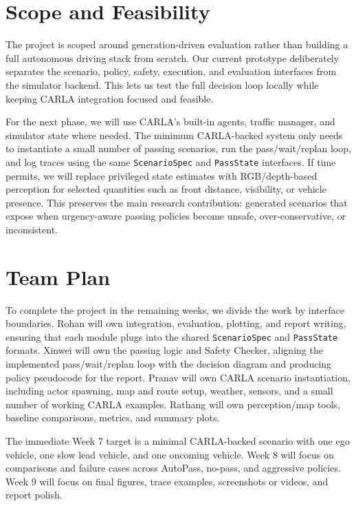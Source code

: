 \documentclass[10pt,twocolumn,letterpaper]{article}
\begin{document}

\section{Scope and Feasibility}
The project is scoped around generation-driven evaluation rather than building a full autonomous driving stack from scratch. Our current prototype deliberately separates the scenario, policy, safety, execution, and evaluation interfaces from the simulator backend. This lets us test the full decision loop locally while keeping CARLA integration focused and feasible. 

For the next phase, we will use CARLA's built-in agents, traffic manager, and simulator state where needed. The minimum CARLA-backed system only needs to instantiate a small number of passing scenarios, run the pass/wait/replan loop, and log traces using the same \texttt{ScenarioSpec} and \texttt{PassState} interfaces. If time permits, we will replace privileged state estimates with RGB/depth-based perception for selected quantities such as front distance, visibility, or vehicle presence. This preserves the main research contribution: generated scenarios that expose when urgency-aware passing policies become unsafe, over-conservative, or inconsistent.

\section{Team Plan}

To complete the project in the remaining weeks, we divide the work by interface boundaries. Rohan will own integration, evaluation, plotting, and report writing, ensuring that each module plugs into the shared \texttt{ScenarioSpec} and \texttt{PassState} formats. Xinwei will own the passing logic and Safety Checker, aligning the implemented pass/wait/replan loop with the decision diagram and producing policy pseudocode for the report. Pranav will own CARLA scenario instantiation, including actor spawning, map and route setup, weather, sensors, and a small number of working CARLA examples. Rathang will own perception/map tools, baseline comparisons, metrics, and summary plots.

The immediate Week 7 target is a minimal CARLA-backed scenario with one ego vehicle, one slow lead vehicle, and one oncoming vehicle. Week 8 will focus on comparisons and failure cases across AutoPass, no-pass, and aggressive policies. Week 9 will focus on final figures, trace examples, screenshots or videos, and report polish.

{\small
\vspace{-4pt}


}
\end{document}
